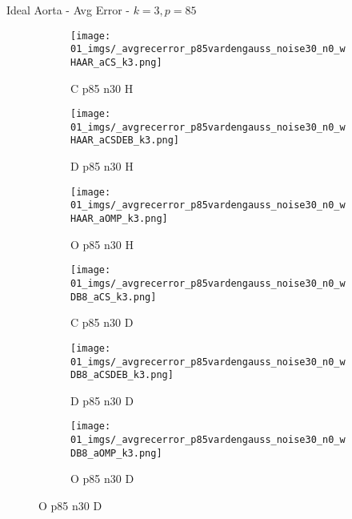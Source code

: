 \begin{frame}{Ideal Aorta - Avg Error - $k=3,p=85$}{}
\begin{figure}
\begin{subfigure}{0.13\textwidth}
\texttt{[image: 01\_imgs/\_avgrecerror\_p85vardengauss\_noise30\_n0\_wHAAR\_aCS\_k3.png]}
\caption*{\tiny C p85 n30 H}
\end{subfigure}
\begin{subfigure}{0.13\textwidth}
\texttt{[image: 01\_imgs/\_avgrecerror\_p85vardengauss\_noise30\_n0\_wHAAR\_aCSDEB\_k3.png]}
\caption*{\tiny D p85 n30 H}
\end{subfigure}
\begin{subfigure}{0.13\textwidth}
\texttt{[image: 01\_imgs/\_avgrecerror\_p85vardengauss\_noise30\_n0\_wHAAR\_aOMP\_k3.png]}
\caption*{\tiny O p85 n30 H}
\end{subfigure}
\begin{subfigure}{0.13\textwidth}
\texttt{[image: 01\_imgs/\_avgrecerror\_p85vardengauss\_noise30\_n0\_wDB8\_aCS\_k3.png]}
\caption*{\tiny C p85 n30 D}
\end{subfigure}
\begin{subfigure}{0.13\textwidth}
\texttt{[image: 01\_imgs/\_avgrecerror\_p85vardengauss\_noise30\_n0\_wDB8\_aCSDEB\_k3.png]}
\caption*{\tiny D p85 n30 D}
\end{subfigure}
\begin{subfigure}{0.13\textwidth}
\texttt{[image: 01\_imgs/\_avgrecerror\_p85vardengauss\_noise30\_n0\_wDB8\_aOMP\_k3.png]}
\caption*{\tiny O p85 n30 D}
\end{subfigure}
\end{figure}
\end{frame}

